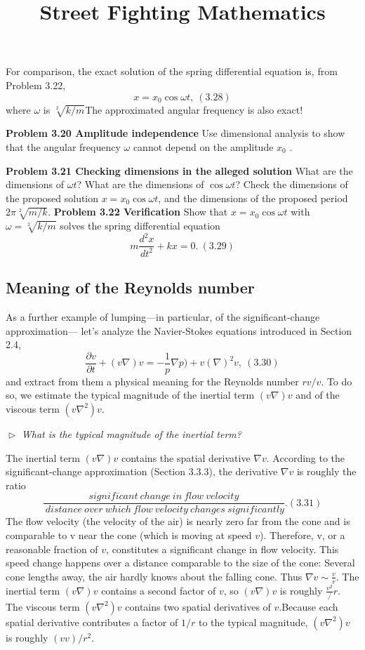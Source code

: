 \documentclass [a4paper] {book}
\title{Street Fighting Mathematics}
\begin{document}
For comparison, the exact solution of the spring differential equation is, from Problem 3.22,
\[ x = x_0\cos\omega t , ~(3.28) \]
where $\omega$ is $\sqrt[2]{k/m} $The approximated angular frequency is also exact!

\noindent \textbf{Problem 3.20 Amplitude independence}
Use dimensional analysis to show that the angular frequency $\omega$ cannot depend on the amplitude $x_0$ .

\noindent \textbf{Problem 3.21 Checking dimensions in the alleged solution}
What are the dimensions of $\omega t$? What are the dimensions of $\cos\omega t$? Check the dimensions of the proposed solution $x = x_0\cos\omega t$, and the dimensions of the proposed period $2\pi\sqrt[2]{m/k}$. 
\noindent \textbf{Problem 3.22 Verification}
Show that $x = x_0\cos\omega t$ with $\omega =\sqrt[2]{k/m} $ solves the spring differential equation 
\[m\frac{d^2x}{dt^2} + kx = 0. ~(3.29)\]
\subsection{\textbf{ Meaning of the Reynolds number}}
As a further example of lumping---in particular, of the significant-change approximation--- let’s analyze the Navier-Stokes equations introduced in Section 2.4, 
\[\frac{\partial v}{\partial t} +(v\nabla)v  =-\frac{1}p \nabla p)+v(\nabla)^2 v, ~(3.30)\]
and extract from them a physical meaning for the Reynolds number $rv/v$.
To do so, we estimate the typical magnitude of the inertial term $(v\nabla)v$ and of the viscous term $({v\nabla}^{2})v$.  

\noindent $\vartriangleright$ \textit{What is the typical magnitude of the inertial term? }
\noindent

The inertial term $(v\nabla)v$  contains the spatial derivative $\nabla v$. According to the significant-change approximation (Section 3.3.3), the derivative $\nabla v$ is roughly the ratio 
\[\frac{significant~change~in~flow~velocity}{~distance~over~which~flow~velocity~changes~significantly}. (3.31)\]
\newpage
 The flow velocity (the velocity of the air) is nearly zero far from the cone and is comparable to v near the cone (which is moving at speed $v$). Therefore, v, or a reasonable fraction of $v$, constitutes a significant change in flow velocity. This speed change happens over a distance comparable to the size of the cone: Several cone lengths away, the air hardly knows about the falling cone. Thus $\nabla v ∼ \frac{v}r$. The inertial term $(v\nabla)v$ contains a second factor of $v$, so $(v\nabla)v$ is roughly $\frac{v^2}/r$. 
\noindent The viscous term $({v\nabla}^{2})v$ contains two spatial derivatives of $v$.Because each spatial derivative contributes a factor of $1/r$ to the typical magnitude, $({v\nabla}^{2})v$ is roughly $(vv)/r^2$.
\end{document}
